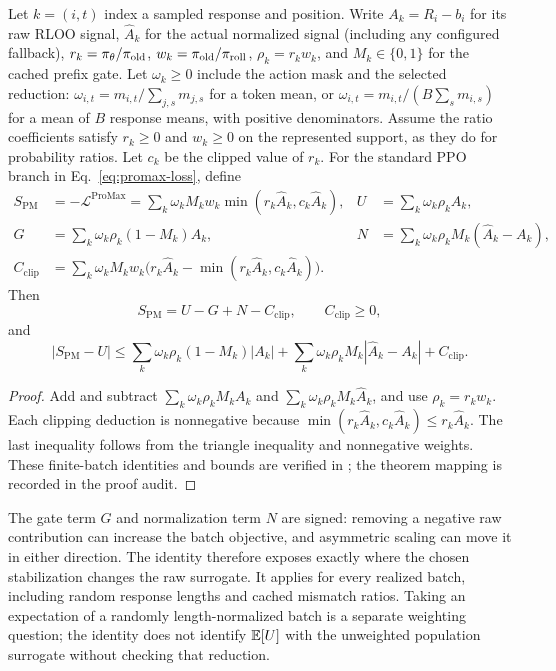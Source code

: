 \begin{proposition}
\label{prop:promax-objective-split}
Let $k=(i,t)$ index a sampled response and position. Write $A_k=R_i-b_i$ for its raw RLOO signal, $\hat A_k$ for the actual normalized
signal (including any configured fallback), $r_k=\pi_{\theta}/\pi_{\mathrm{old}}$, $w_k=\pi_{\mathrm{old}}/\pi_{\mathrm{roll}}$, $\rho_k=r_kw_k$, and
$M_k\in\{0,1\}$ for the cached prefix gate. Let $\omega_k\ge0$ include the action mask and the selected reduction:
$\omega_{i,t}=m_{i,t}/\sum_{j,s}m_{j,s}$ for a token mean, or
$\omega_{i,t}=m_{i,t}/(B\sum_s m_{i,s})$ for a mean of $B$ response means, with positive denominators.
Assume the ratio coefficients satisfy $r_k\ge0$ and $w_k\ge0$ on the represented support, as they do for probability ratios.
Let $c_k$ be the clipped value of $r_k$. For the standard PPO branch in Eq.~\eqref{eq:promax-loss}, define
\begin{align*}
    S_{\mathrm{PM}}&=-\mathcal L^{\mathrm{ProMax}}
      =\sum_k\omega_k M_k w_k\min(r_k\hat A_k,c_k\hat A_k),
    &U&=\sum_k\omega_k\rho_k A_k,\\
    G&=\sum_k\omega_k\rho_k(1-M_k)A_k,
    &N&=\sum_k\omega_k\rho_k M_k(\hat A_k-A_k),\\
    C_{\mathrm{clip}}&=\sum_k\omega_k M_k w_k
      \bigl(r_k\hat A_k-\min(r_k\hat A_k,c_k\hat A_k)\bigr).
\end{align*}
Then
\begin{equation}
    S_{\mathrm{PM}}=U-G+N-C_{\mathrm{clip}},
    \qquad C_{\mathrm{clip}}\ge0,
    \label{eq:promax-objective-split}
\end{equation}
and
\begin{equation*}
    |S_{\mathrm{PM}}-U|
    \le\sum_k\omega_k\rho_k(1-M_k)|A_k|
      +\sum_k\omega_k\rho_k M_k|\hat A_k-A_k|+C_{\mathrm{clip}}.
\end{equation*}
\end{proposition}

\begin{proof}
Add and subtract $\sum_k\omega_k\rho_k M_k A_k$ and
$\sum_k\omega_k\rho_k M_k\hat A_k$, and use $\rho_k=r_kw_k$.
Each clipping deduction is nonnegative because $\min(r_k\hat A_k,c_k\hat A_k)\le r_k\hat A_k$.
The last inequality follows from the triangle inequality and nonnegative weights.
These finite-batch identities and bounds are verified in
; the theorem mapping is recorded in the proof audit.
\end{proof}

The gate term $G$ and normalization term $N$ are signed: removing a negative raw contribution can increase the batch objective,
and asymmetric scaling can move it in either direction. The identity therefore exposes exactly where the chosen stabilization
changes the raw surrogate. It applies for every realized batch, including random response lengths and cached mismatch ratios.
Taking an expectation of a randomly length-normalized batch is a separate weighting question; the identity does not identify
$\mathbb{E}[U]$ with the unweighted population surrogate without checking that reduction.

